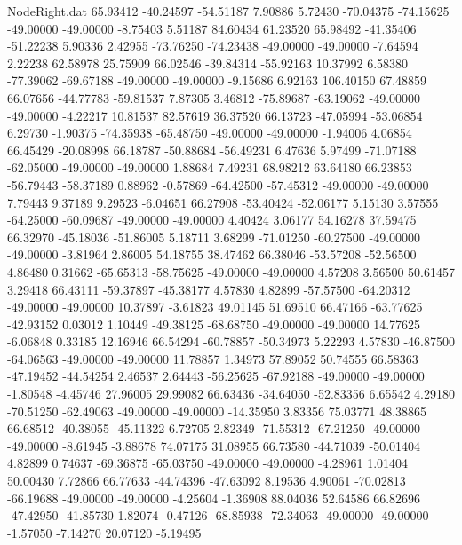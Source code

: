 \begin{filecontents}{NodeRight.dat}
  65.93412  -40.24597  -54.51187     7.90886    5.72430  -70.04375  -74.15625  -49.00000  -49.00000   -8.75403    5.51187   84.60434   61.23520
  65.98492  -41.35406  -51.22238     5.90336    2.42955  -73.76250  -74.23438  -49.00000  -49.00000   -7.64594    2.22238   62.58978   25.75909
  66.02546  -39.84314  -55.92163    10.37992    6.58380  -77.39062  -69.67188  -49.00000  -49.00000   -9.15686    6.92163  106.40150   67.48859
  66.07656  -44.77783  -59.81537     7.87305    3.46812  -75.89687  -63.19062  -49.00000  -49.00000   -4.22217   10.81537   82.57619   36.37520
  66.13723  -47.05994  -53.06854     6.29730   -1.90375  -74.35938  -65.48750  -49.00000  -49.00000   -1.94006    4.06854   66.45429  -20.08998
  66.18787  -50.88684  -56.49231     6.47636    5.97499  -71.07188  -62.05000  -49.00000  -49.00000    1.88684    7.49231   68.98212   63.64180
  66.23853  -56.79443  -58.37189     0.88962   -0.57869  -64.42500  -57.45312  -49.00000  -49.00000    7.79443    9.37189    9.29523   -6.04651
  66.27908  -53.40424  -52.06177     5.15130    3.57555  -64.25000  -60.09687  -49.00000  -49.00000    4.40424    3.06177   54.16278   37.59475
  66.32970  -45.18036  -51.86005     5.18711    3.68299  -71.01250  -60.27500  -49.00000  -49.00000   -3.81964    2.86005   54.18755   38.47462
  66.38046  -53.57208  -52.56500     4.86480    0.31662  -65.65313  -58.75625  -49.00000  -49.00000    4.57208    3.56500   50.61457    3.29418
  66.43111  -59.37897  -45.38177     4.57830    4.82899  -57.57500  -64.20312  -49.00000  -49.00000   10.37897   -3.61823   49.01145   51.69510
  66.47166  -63.77625  -42.93152     0.03012    1.10449  -49.38125  -68.68750  -49.00000  -49.00000   14.77625   -6.06848    0.33185   12.16946
  66.54294  -60.78857  -50.34973     5.22293    4.57830  -46.87500  -64.06563  -49.00000  -49.00000   11.78857    1.34973   57.89052   50.74555
  66.58363  -47.19452  -44.54254     2.46537    2.64443  -56.25625  -67.92188  -49.00000  -49.00000   -1.80548   -4.45746   27.96005   29.99082
  66.63436  -34.64050  -52.83356     6.65542    4.29180  -70.51250  -62.49063  -49.00000  -49.00000  -14.35950    3.83356   75.03771   48.38865
  66.68512  -40.38055  -45.11322     6.72705    2.82349  -71.55312  -67.21250  -49.00000  -49.00000   -8.61945   -3.88678   74.07175   31.08955
  66.73580  -44.71039  -50.01404     4.82899    0.74637  -69.36875  -65.03750  -49.00000  -49.00000   -4.28961    1.01404   50.00430    7.72866
  66.77633  -44.74396  -47.63092     8.19536    4.90061  -70.02813  -66.19688  -49.00000  -49.00000   -4.25604   -1.36908   88.04036   52.64586
  66.82696  -47.42950  -41.85730     1.82074   -0.47126  -68.85938  -72.34063  -49.00000  -49.00000   -1.57050   -7.14270   20.07120   -5.19495

\end{filecontents}
